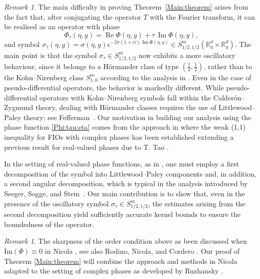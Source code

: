 \documentclass[12pt, reqno]{amsart}
\theoremstyle{definition}
\theoremstyle{remark}
\newtheorem{remark}[theorem]{Remark}
\numberwithin{equation}{section}
\begin{document}
\begin{remark}
    The main difficulty in proving Theorem~\ref{Main:theorem} arises from the fact that, after conjugating the operator $T$ with the Fourier transform, it can be realised as an operator with phase
\begin{equation}\label{Phi:tau:eta}
    \Phi_{\tau}(\eta,y)=\operatorname{Re}\Phi(\eta,y)+\tau\,\operatorname{Im}\Phi(\eta,y),
\end{equation}
and symbol $ 
\sigma_{\tau}(\eta,y)=\sigma(\eta,y)e^{-2\pi(1+i\tau)\operatorname{Im}\Phi(\eta,y)}\in S^m_{1/2,1/2}(\mathbb{R}^d_\eta\times \mathbb{R}^d_y).$ 
The main point is that the symbol $\sigma_{\tau}\in S^m_{1/2,1/2}$ now exhibits a more oscillatory behaviour, since it belongs to a H\"ormander class of type $(\tfrac12,\tfrac12)$, rather than to the Kohn--Nirenberg class $S^m_{1,0}$ according to the analysis in \cite{Nicola2010}. Even in the case of pseudo-differential operators, the behavior is markedly different. 
While pseudo-differential operators with Kohn--Nirenberg symbols fall within the Calder\'on--Zygmund theory, 
dealing with H\"ormander classes requires the use of Littlewood--Paley theory; see Fefferman~\cite{Fefferman1973}. Our motivation in building our analysis using the phase function \ref{Phi:tau:eta} comes from the approach in \cite{CR2024} where the weak (1,1) inequality for FIOs with complex phases has been established extending a previous result for real-valued phases due to T. Tao \cite{Tao}.

In the setting of real-valued phase functions, as in \cite{Nicola2010}, one must employ a first decomposition 
of the symbol into Littlewood--Paley components and, in addition, a second angular decomposition, which is typical 
in the analysis introduced by Seeger, Sogge, and Stein~\cite{SSS}. Our main contribution is to show that, even in the 
presence of the oscillatory symbol $\sigma_{\tau}\in S^{m}_{1/2,1/2}$, the estimates arising from the second 
decomposition yield sufficiently accurate kernel bounds to ensure the boundedness of the operator.
\end{remark}
\begin{remark}
   The sharpness of the order condition above as been discussed when  $\text{Im}(\Phi)\equiv 0$ in  Nicola \cite[Page 209]{Nicola2010}, see also Rodino, Nicola, and Cordero \cite{CNR2009}. Our proof of Theorem \ref{Main:theorem} will combine the approach and methods in Nicola \cite{Nicola2010} adapted to the setting of complex phases as developed by Ruzhansky \cite[Page 47]{Ruz2001}.  
\end{remark}
\end{document}
